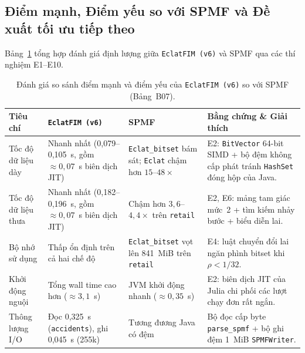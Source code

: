 \subsection{Điểm mạnh, Điểm yếu so với SPMF và Đề xuất tối ưu tiếp theo}
\label{subsec:strengths_proposals}

Bảng~\ref{tab:b07_strengths} tổng hợp đánh giá định lượng giữa \texttt{EclatFIM (v6)} và SPMF qua các thí nghiệm E1--E10.

\begin{table}[!t]
\centering
\caption{Đánh giá so sánh điểm mạnh và điểm yếu của \texttt{EclatFIM (v6)} so với SPMF (Bảng~B07).}
\label{tab:b07_strengths}
\scriptsize
\begin{tabular}{@{}p{2.3cm}p{3.8cm}p{4.0cm}p{6.2cm}@{}}
\toprule
Tiêu chí & \texttt{EclatFIM (v6)} & SPMF & Bằng chứng \& Giải thích \\
\midrule
Tốc độ dữ liệu dày & Nhanh nhất (0,079--0,105~s, gồm $\approx 0{,}07$~s biên dịch JIT) & \texttt{Eclat\_bitset} bám sát; \texttt{Eclat} chậm hơn $15$--$48\times$ & E2: \texttt{BitVector} 64-bit SIMD + bộ đệm không cấp phát tránh \texttt{HashSet} đóng hộp của Java. \\
Tốc độ dữ liệu thưa & Nhanh nhất (0,182--0,196~s, gồm $\approx 0{,}07$~s biên dịch JIT) & Chậm hơn $3{,}6$--$4{,}4\times$ trên \texttt{retail} & E2, E6: mảng tam giác mức~2 + tìm kiếm nhảy bước + biểu diễn lai. \\
Bộ nhớ sử dụng & Thấp ổn định trên cả hai chế độ & \texttt{Eclat\_bitset} vọt lên 841~MiB trên \texttt{retail} & E4: luật chuyển đổi lai ngăn phình bitset khi $\rho < 1/32$. \\
Khởi động nguội & Tổng wall time cao hơn ($\approx 3{,}1$~s) & JVM khởi động nhanh ($\approx 0{,}35$~s) & E2: biên dịch JIT của Julia chi phối các lượt chạy đơn rất ngắn. \\
Thông lượng I/O & Đọc 0,325~s (\texttt{accidents}), ghi 0,045~s (255k) & Tương đương Java có đệm & Bộ đọc cấp byte \texttt{parse\_spmf} + bộ ghi đệm 1~MiB \texttt{SPMFWriter}. \\
\bottomrule
\end{tabular}
\end{table}

